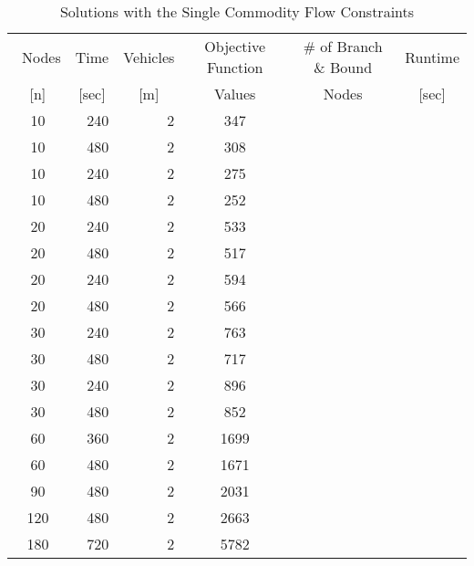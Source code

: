 \documentclass[a4paper]{article}
\begin{document}
\begin{table}[h!]
	\centering
	\caption{Solutions with the Single Commodity Flow Constraints}
		\begin{tabular}{|c|r|r||c|c|c|}
			\hline\
		Nodes & Time & Vehicles	& Objective Function & \# of Branch \& Bound & Runtime\\
   		\multicolumn{1}{|c|}{[n]} & \multicolumn{1}{c|}{[sec]} & \multicolumn{1}{c||}{[m]} & \multicolumn{1}{c|}{Values} & \multicolumn{1}{c|}{Nodes} & \multicolumn{1}{c|}{[sec]} \\
			\hline 
				10	&	240	&	2	&	347		&		&		\\
				10	&	480	&	2	&	308		&		&		\\
				10	&	240	&	2	&	275		&		&		\\
				10	&	480	&	2	&	252		&		&		\\
				20	&	240	&	2	&	533		&		&		\\
				20	&	480	&	2	&	517		&		&		\\
				20	&	240	&	2	&	594		&		&		\\
				20	&	480	&	2	&	566		&		&		\\
				30	&	240	&	2	&	763		&		&		\\
				30	&	480	&	2	&	717		&		&		\\
				30	&	240	&	2	&	896		&		&		\\
				30	&	480	&	2	&	852		&		&		\\
				60	&	360	&	2	&	1699	&		&		\\
				60	&	480	&	2	&	1671	&		&		\\
				90	&	480	&	2	&	2031	&		&		\\
				120	&	480	&	2	&	2663	&		&		\\
				180	&	720	&	2	&	5782	&		&		\\
				
			\hline 
		\end{tabular}
	\label{tab:scf}
\end{table}
\end{document}
